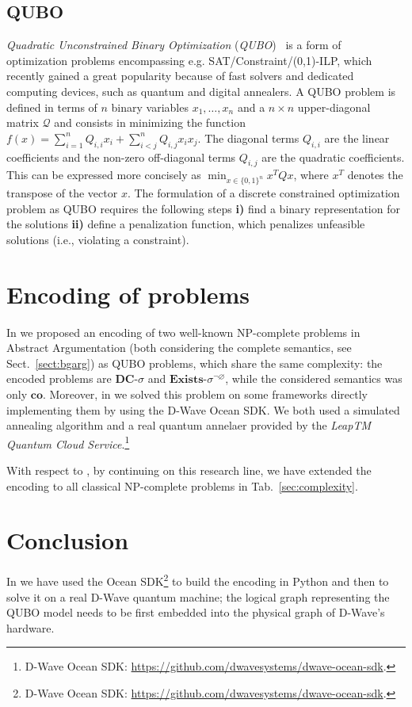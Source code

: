 \documentclass[conference]{IEEEtran}
\newcommand{\co}{\mathbf{co}}
\newcommand{\dc}{\mathbf{DC}}
\begin{document}
\subsection{QUBO}\label{sect:qubo}
\emph{Quadratic Unconstrained Binary Optimization} (\emph{QUBO})~\cite{glover,glover2} is a
form of optimization problems encompassing e.g. SAT/Constraint/(0,1)-ILP, which  recently gained a great popularity because of fast solvers and dedicated computing devices, such as
quantum and digital annealers. 
A QUBO problem is defined in terms of $n$ binary variables $x_1,\dots,x_n$
and a $n\times n$ upper-diagonal matrix $\mathcal{Q}$ and consists in 
minimizing the function $f(x) = \sum_{i=1}^n Q_{i,i} x_i + \sum_{i < j}^n Q_{i,j} x_i x_j$.
The diagonal terms $Q_{i,i}$ are the linear coefficients and the non-zero off-diagonal terms $Q_{i,j}$
are the quadratic coefficients. This can be expressed more concisely as $\min_{x \in \{0,1\}^n} x^T Q x$, where $x^T$ denotes the transpose of the vector $x$. The formulation of a discrete constrained optimization problem as QUBO requires
the following steps {\bf i)}  find a binary representation for the solutions {\bf ii)}  define a penalization function, which penalizes unfeasible solutions (i.e., violating a constraint).

\section{Encoding of problems}\label{sect:encoding}
In \cite{pricai22} we proposed an encoding of two well-known NP-complete problems in Abstract Argumentation (both considering the complete semantics, see Sect.~\ref{sect:bgarg}) as QUBO problems, which share the same complexity: the encoded problems are  
$\dc\textit{-}\sigma$ and
$\mathit{\textbf{Exists}}\textit{-}\sigma^{\neg\varnothing}$, 
while the considered semantics was only $\co$.  
Moreover, in \cite{pricai22} we solved this problem on some frameworks directly  implementing them by using the D-Wave Ocean SDK. We both used a simulated annealing algorithm and a real quantum annelaer provided by the \emph{LeapTM Quantum Cloud Service}.\footnote{D-Wave Ocean SDK: \url{https://github.com/dwavesystems/dwave-ocean-sdk}.}

With respect to \cite{pricai22}, by continuing on this research line, we have extended the encoding to all classical NP-complete problems in Tab.~\ref{sec:complexity}.




\section{Conclusion}\label{sec:conclusion}
In \cite{pricai22} we have used the Ocean SDK\footnote{D-Wave Ocean SDK: \url{https://github.com/dwavesystems/dwave-ocean-sdk}.} to build the encoding in Python and then to solve it on a real D-Wave quantum machine; the logical graph representing the QUBO  model needs to be first embedded into the physical graph of D-Wave's hardware.



\end{document}
